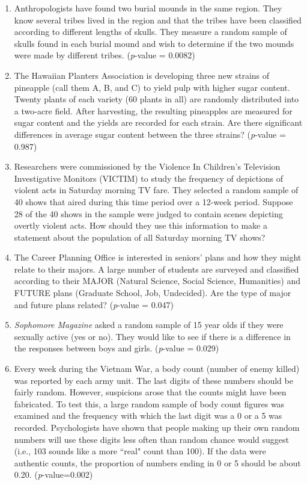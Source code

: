 \documentclass[twoside,openany]{tufte-book}
\begin{document}
\begin{enumerate}[leftmargin=1cm, itemsep=.2em]
\item Anthropologists have found two burial mounds in the same region. They know several tribes lived in the region and that the tribes have been classified according to different lengths of skulls. They measure a random sample of skulls found in each burial mound and wish to determine if the two mounds were made by different tribes.  (\textit{p}-value = 0.0082) 

\bigskip
	
\item The Hawaiian Planters Association is developing three new strains of pineapple (call them A, B, and C) to yield pulp with higher sugar content. Twenty plants of each variety (60 plants in all) are randomly distributed into a two-acre field. After harvesting, the resulting pineapples are measured for sugar content and the yields are recorded for each strain.  Are there significant differences in average sugar content between the three strains? (\textit{p}-value = 0.987)
\bigskip	
\item Researchers were commissioned by the Violence In Children's Television Investigative Monitors (VICTIM) to study the frequency of depictions of violent acts in Saturday morning TV fare.  They selected a random sample of 40 shows that aired during this time period over a 12-week period.  Suppose 28 of the 40 shows in the sample were judged to contain scenes depicting overtly violent acts.  How should they use this information to make a statement about the population of all Saturday morning TV shows?
\bigskip	
\item The Career Planning Office is interested in seniors' plans and how they might relate to their majors.  A large number of students are surveyed and classified according to their MAJOR (Natural Science, Social Science, Humanities) and FUTURE plans (Graduate School, Job, Undecided).  Are the type of major and future plans related?  (\textit{p}-value = 0.047)
\bigskip
\item \textit{Sophomore Magazine} asked a random sample of 15 year olds if they were sexually active (yes or no).  They would like to see if there is a difference in the responses between boys and girls.     (\textit{p}-value = 0.029)
\bigskip	
\item Every week during the Vietnam War, a body count (number of enemy killed) was reported by each army unit. The last digits of these numbers should be fairly random.  However, suspicions arose that the counts might have been fabricated.  To test this, a large random sample of body count figures was examined and the frequency with which the last digit was a 0 or a 5 was recorded.  Psychologists have shown that people making up their own random numbers will use these digits less often than random chance would suggest (i.e., 103 sounds like a more ``real" count than 100).  If the data were authentic counts, the proportion of numbers ending in 0 or 5 should be about 0.20.  (\textit{p}-value=0.002)

\end{enumerate}
\end{document}
